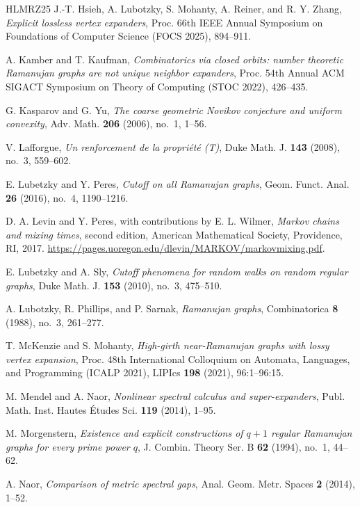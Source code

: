 \documentclass[11pt,reqno]{amsart}
\theoremstyle{definition}
\begin{document}
\begin{thebibliography}{HLMRZ25}
J.-T. Hsieh, A. Lubotzky, S. Mohanty, A. Reiner, and R. Y. Zhang,
\emph{Explicit lossless vertex expanders},
Proc. 66th IEEE Annual Symposium on Foundations of Computer Science (FOCS 2025), 894--911.

A. Kamber and T. Kaufman,
\emph{Combinatorics via closed orbits: number theoretic Ramanujan graphs are not unique neighbor expanders},
Proc. 54th Annual ACM SIGACT Symposium on Theory of Computing (STOC 2022), 426--435.

G. Kasparov and G. Yu,
\emph{The coarse geometric Novikov conjecture and uniform convexity},
Adv. Math. \textbf{206} (2006), no.~1, 1--56.

V. Lafforgue,
\emph{Un renforcement de la propri\'et\'e (T)},
Duke Math. J. \textbf{143} (2008), no.~3, 559--602.

E. Lubetzky and Y. Peres,
\emph{Cutoff on all Ramanujan graphs},
Geom. Funct. Anal. \textbf{26} (2016), no.~4, 1190--1216.

D. A. Levin and Y. Peres, with contributions by E. L. Wilmer,
\emph{Markov chains and mixing times}, second edition,
American Mathematical Society, Providence, RI, 2017.
\url{https://pages.uoregon.edu/dlevin/MARKOV/markovmixing.pdf}.

E. Lubetzky and A. Sly,
\emph{Cutoff phenomena for random walks on random regular graphs},
Duke Math. J. \textbf{153} (2010), no.~3, 475--510.

A. Lubotzky, R. Phillips, and P. Sarnak,
\emph{Ramanujan graphs},
Combinatorica \textbf{8} (1988), no.~3, 261--277.


T. McKenzie and S. Mohanty,
\emph{High-girth near-Ramanujan graphs with lossy vertex expansion},
Proc. 48th International Colloquium on Automata, Languages, and Programming
(ICALP 2021), LIPIcs \textbf{198} (2021), 96:1--96:15.

M. Mendel and A. Naor,
\emph{Nonlinear spectral calculus and super-expanders},
Publ. Math. Inst. Hautes \'Etudes Sci. \textbf{119} (2014), 1--95.

M. Morgenstern,
\emph{Existence and explicit constructions of $q+1$ regular Ramanujan graphs for every prime power $q$},
J. Combin. Theory Ser. B \textbf{62} (1994), no.~1, 44--62.

A. Naor,
\emph{Comparison of metric spectral gaps},
Anal. Geom. Metr. Spaces \textbf{2} (2014), 1--52.


\end{thebibliography}
\end{document}
